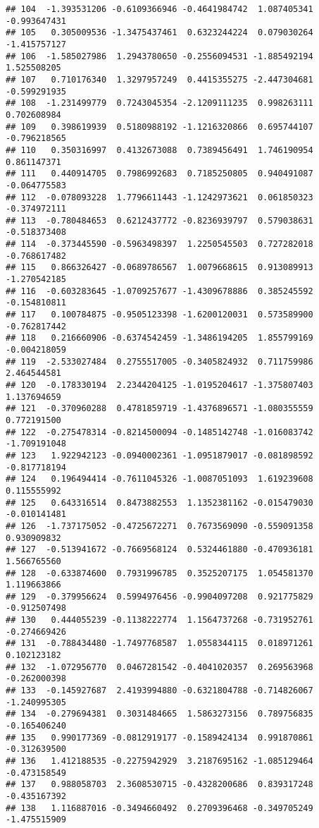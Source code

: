 \documentclass[
]{article}
\begin{document}
\begin{verbatim}
## 104  -1.393531206 -0.6109366946 -0.4641984742  1.087405341 -0.993647431
## 105   0.305009536 -1.3475437461  0.6323244224  0.079030264 -1.415757127
## 106  -1.585027986  1.2943780650 -0.2556094531 -1.885492194  1.525508205
## 107   0.710176340  1.3297957249  0.4415355275 -2.447304681 -0.599291935
## 108  -1.231499779  0.7243045354 -2.1209111235  0.998263111  0.702608984
## 109   0.398619939  0.5180988192 -1.1216320866  0.695744107 -0.796218565
## 110   0.350316997  0.4132673088  0.7389456491  1.746190954  0.861147371
## 111   0.440914705  0.7986992683  0.7185250805  0.940491087 -0.064775583
## 112  -0.078093228  1.7796611443 -1.1242973621  0.061850323 -0.374972111
## 113  -0.780484653  0.6212437772 -0.8236939797  0.579038631 -0.518373408
## 114  -0.373445590 -0.5963498397  1.2250545503  0.727282018 -0.768617482
## 115   0.866326427 -0.0689786567  1.0079668615  0.913089913 -1.270542185
## 116  -0.603283645 -1.0709257677 -1.4309678886  0.385245592 -0.154810811
## 117   0.100784875 -0.9505123398 -1.6200120031  0.573589900 -0.762817442
## 118   0.216660906 -0.6374542459 -1.3486194205  1.855799169 -0.004218059
## 119  -2.533027484  0.2755517005 -0.3405824932  0.711759986  2.464544581
## 120  -0.178330194  2.2344204125 -1.0195204617 -1.375807403  1.137694659
## 121  -0.370960288  0.4781859719 -1.4376896571 -1.080355559  0.772191500
## 122  -0.275478314 -0.8214500094 -0.1485142748 -1.016083742 -1.709191048
## 123   1.922942123 -0.0940002361 -1.0951879017 -0.081898592 -0.817718194
## 124   0.196494414 -0.7611045326 -1.0087051093  1.619239608  0.115555992
## 125   0.643316514  0.8473882553  1.1352381162 -0.015479030 -0.010141481
## 126  -1.737175052 -0.4725672271  0.7673569090 -0.559091358  0.930909832
## 127  -0.513941672 -0.7669568124  0.5324461880 -0.470936181  1.566765560
## 128  -0.633874600  0.7931996785  0.3525207175  1.054581370  1.119663866
## 129  -0.379956624  0.5994976456 -0.9904097208  0.921775829 -0.912507498
## 130   0.444055239 -0.1138222774  1.1564737268 -0.731952761 -0.274669426
## 131  -0.788434480 -1.7497768587  1.0558344115  0.018971261  0.102123182
## 132  -1.072956770  0.0467281542 -0.4041020357  0.269563968 -0.262000398
## 133  -0.145927687  2.4193994880 -0.6321804788 -0.714826067 -1.240995305
## 134  -0.279694381  0.3031484665  1.5863273156  0.789756835 -0.165406240
## 135   0.990177369 -0.0812919177 -0.1589424134  0.991870861 -0.312639500
## 136   1.412188535 -0.2275942929  3.2187695162 -1.085129464 -0.473158549
## 137   0.988058703  2.3608530715 -0.4328200686  0.839317248 -0.435167392
## 138   1.116887016 -0.3494660492  0.2709396468 -0.349705249 -1.475515909

\end{verbatim}
\end{document}
